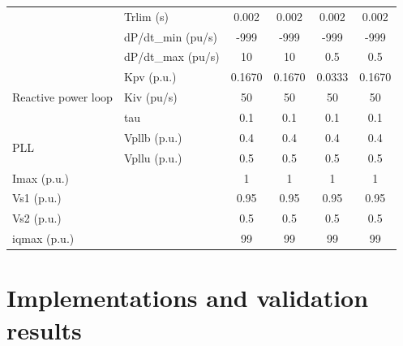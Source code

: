 \documentclass{report}
\begin{document}
\begin{table}[H]
\begin{tabular}{ll|c|c|c|c}
\multicolumn{1}{l|}{}                                     & Trlim (s)     & 0.002     & 0.002     & 0.002     & 0.002     \\ \cline{2-6} 
\multicolumn{1}{l|}{}                                     & dP/dt\_min (pu/s) & -999      & -999      & -999      & -999      \\ \cline{2-6} 
\multicolumn{1}{l|}{}                                     & dP/dt\_max (pu/s) & 10        & 10        & 0.5       & 0.5       \\ \hline
\multicolumn{1}{l|}{\multirow{3}{*}{Reactive power loop}} & Kpv (p.u.)       & 0.1670    & 0.1670    & 0.0333    & 0.1670    \\ \cline{2-6} 
\multicolumn{1}{l|}{}                                     & Kiv (pu/s)       & 50        & 50        & 50        & 50        \\ \cline{2-6} 
\multicolumn{1}{l|}{}                                     & tau        & 0.1       & 0.1       & 0.1       & 0.1       \\ \hline
\multicolumn{1}{l|}{\multirow{2}{*}{PLL}}                 & Vpllb (p.u.)     & 0.4       & 0.4       & 0.4       & 0.4       \\ \cline{2-6} 
\multicolumn{1}{l|}{}                                     & Vpllu (p.u.)     & 0.5       & 0.5       & 0.5       & 0.5       \\ \hline
\multicolumn{2}{l|}{Imax (p.u.)}                                              & 1         & 1         & 1         & 1         \\ \hline
\multicolumn{2}{l|}{Vs1 (p.u.)}                                               & 0.95      & 0.95      & 0.95      & 0.95      \\ \hline
\multicolumn{2}{l|}{Vs2 (p.u.)}                                               & 0.5       & 0.5       & 0.5       & 0.5       \\ \hline
\multicolumn{2}{l|}{iqmax (p.u.)}                                             & 99        & 99        & 99        & 99       
\end{tabular}
\label{table_4VSC_model_parameters_OP2}
\end{table}

\section{Implementations and validation results}
\end{document}
